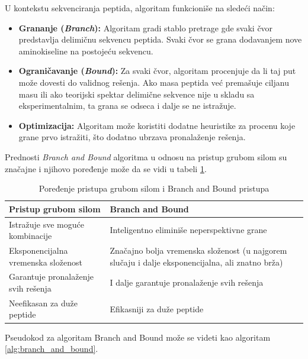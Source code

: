 \documentclass[12pt,oneside]{memoir}
\begin{document}
U kontekstu sekvenciranja peptida, algoritam funkcioniše na sledeći način:
\begin{itemize}
    \item \textbf{Grananje (\emph{Branch}):} Algoritam gradi stablo pretrage gde svaki čvor predstavlja delimičnu sekvencu peptida. Svaki čvor se grana dodavanjem nove aminokiseline na postojeću sekvencu.
    \item \textbf{Ograničavanje (\emph{Bound}):} Za svaki čvor, algoritam procenjuje da li taj put može dovesti do validnog rešenja. Ako masa peptida već premašuje ciljanu masu ili ako teorijski spektar delimične sekvence nije u skladu sa eksperimentalnim, ta grana se odseca i dalje se ne istražuje.
    \item \textbf{Optimizacija:} Algoritam može koristiti dodatne heuristike za procenu koje grane prvo istražiti, što dodatno ubrzava pronalaženje rešenja.
\end{itemize}

Prednosti \emph{Branch and Bound} algoritma u odnosu na pristup grubom silom su značajne i njihovo poređenje može da se vidi u tabeli \ref{tab:branch_vs_brute}.

\begin{table}[H]
\centering
\renewcommand{\arraystretch}{1.5}
\begin{tabular}{|>{\raggedright\arraybackslash}m{}|>{\raggedright\arraybackslash}m{}|}
\hline
\textbf{Pristup grubom silom} & \textbf{Branch and Bound} \\
\hline
Istražuje sve moguće kombinacije & Inteligentno eliminiše neperspektivne grane \\
\hline
Eksponencijalna vremenska složenost & Značajno bolja vremenska složenost (u najgorem slučaju i dalje eksponencijalna, ali znatno brža) \\
\hline
Garantuje pronalaženje svih rešenja & I dalje garantuje pronalaženje svih rešenja \\
\hline
Neefikasan za duže peptide & Efikasniji za duže peptide \\
\hline
\end{tabular}
\caption{Poređenje pristupa grubom silom i Branch and Bound pristupa}
\label{tab:branch_vs_brute}
\end{table}

Pseudokod za algoritam Branch and Bound može se videti kao algoritam \ref{alg:branch_and_bound}.
\end{document}
